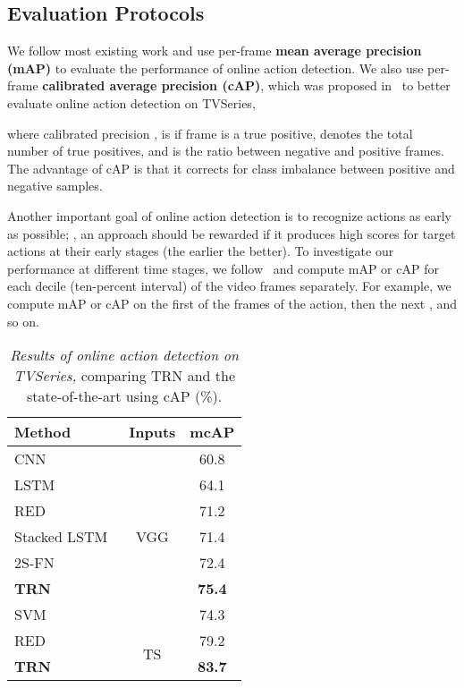 \subsection{Evaluation Protocols}
\label{sec:protocols}

We follow most existing work and use per-frame \textbf{mean average
precision (mAP)} to evaluate the performance of online action
detection. We also use per-frame \textbf{calibrated average
precision (cAP)}, which was proposed in~\cite{de2016online} to better
evaluate online action detection on TVSeries,

where calibrated precision ,
 is  if frame  is a true
positive,  denotes the total number of true positives, and  is
the ratio between negative and positive frames. The advantage of cAP
is that it corrects for class imbalance between positive
and negative samples.

Another important goal of online
action detection is to recognize actions as early as
possible; \ie, an approach should be rewarded if it
produces high scores for target actions at their early stages (the
earlier the better).
To investigate our performance at different time stages, we
follow~\cite{de2016online} and compute mAP or cAP for each decile
(ten-percent interval) of the video frames separately. For example,
we compute mAP or cAP on the first  of the frames of the action,
then the next , and so on.

\begin{table}[t]
    \centering
    \small
    \begin{tabular}
        {@{\quad}l@{\quad}@{\quad}c@{\quad}@{\quad}c@{\quad}}
        \toprule
        Method & Inputs & mcAP \\
        \midrule
        {CNN}~\cite{de2016online} & \multirow{7}{*}{VGG} & 60.8 \\
        {LSTM}~\cite{de2016online} & & 64.1 \\
        {RED}~\cite{gao2017red} & & 71.2 \\
        {Stacked LSTM}~\cite{de2018modeling} & & 71.4 \\
        {2S-FN}~\cite{de2018modeling} & & 72.4\\
        \textbf{TRN} & &\textbf{75.4} \\
        \midrule
        {SVM}~\cite{de2016online} & FV & 74.3 \\
        \midrule
        {RED}~\cite{gao2017red} & \multirow{2}{*}{TS} & 79.2 \\
        \textbf{TRN} & &\textbf{83.7} \\
        \bottomrule
    \end{tabular}
    \vspace{-5pt}
    \caption{\textit{Results of online action detection on TVSeries,}
    comparing TRN and the state-of-the-art using 
    cAP (\%).
    }
    \vspace{-5pt}
    \label{table:tv_detection}
\end{table}

